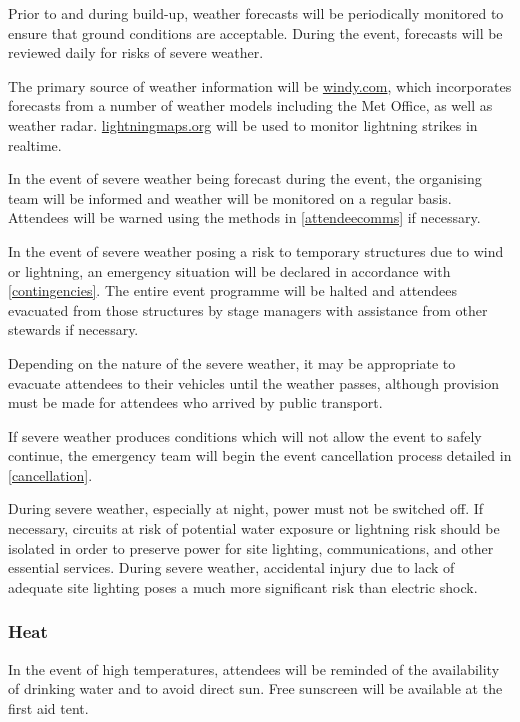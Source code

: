 Prior to and during build-up, weather forecasts will be periodically monitored to ensure
that ground conditions are acceptable. During the event, forecasts will be reviewed
daily for risks of severe weather.

The primary source of weather information will be \href{https://windy.com}{windy.com}, which
incorporates forecasts from a number of weather models including the Met Office, as well as
weather radar. \href{https://lightningmaps.org}{lightningmaps.org} will be used to monitor
lightning strikes in realtime.

In the event of severe weather being forecast during the event, the organising team will
be informed and weather will be monitored on a regular basis. Attendees will be warned
using the methods in \cref{attendeecomms} if necessary.

In the event of severe weather posing a risk to temporary structures due to wind or
lightning, an emergency situation will be declared in accordance with
\cref{contingencies}. The entire event programme will be halted and attendees
evacuated from those structures by stage managers with assistance from other stewards
if necessary.

Depending on the nature of the severe weather, it may be appropriate to evacuate attendees
to their vehicles until the weather passes, although provision must be made for attendees
who arrived by public transport.

If severe weather produces conditions which will not allow the event to safely continue,
the emergency team will begin the event cancellation process detailed in
\cref{cancellation}.

During severe weather, especially at night, power must not be switched off. If
necessary, circuits at risk of potential water exposure or lightning risk should be isolated in
order to preserve power for site lighting, communications, and other essential services.
During severe weather, accidental injury due to lack of adequate site lighting poses a
much more significant risk than electric shock.

\subsubsection{Heat}

In the event of high temperatures, attendees will be reminded of the availability of drinking
water and to avoid direct sun. Free sunscreen will be available at the first aid tent.

